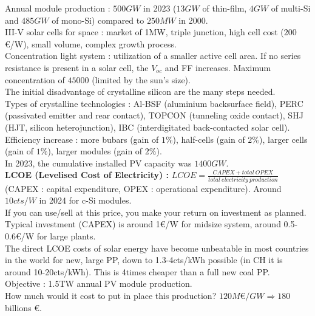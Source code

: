 \documentclass[../main.tex]{subfiles}
\begin{document}
Annual module production : $500GW$ in 2023 ($13GW$ of thin-film, $4GW$ of multi-Si and $485GW$ of mono-Si) compared to $250MW$ in 2000.\\

III-V solar cells for space : market of 1MW, triple junction, high cell cost ($200$€/W), small volume, complex growth process.\\

Concentration light system : utilization of a smaller active cell area. If no series resistance is present in a solar cell, the $V_{oc}$ and FF increases. Maximum concentration of $45000$ (limited by the sun's size). \\


The initial disadvantage of crystalline silicon are the many steps needed.\\
Types of crystalline technologies : Al-BSF (aluminium backsurface field), PERC (passivated emitter and rear contact), TOPCON (tunneling oxide contact), SHJ (HJT, silicon heterojunction), IBC (interdigitated back-contacted solar cell).\\

Efficiency increase : more bubars (gain of $1\%$), half-cells (gain of $2\%$), larger cells (gain of $1\%$), larger modules (gain of $2\%$).\\

In 2023, the cumulative installed PV capacity was $1400GW$.\\

\textbf{LCOE (Levelised Cost of Electricity) :} $LCOE = \frac{CAPEX + total\: OPEX}{total\: electricity\: production}$ (CAPEX : capital expenditure, OPEX : operational expenditure). Around $10cts/W$ in 2024 for c-Si modules.\\
If you can use/sell at this price, you make your return on investment as planned. \\

Typical investment (CAPEX) is around 1€/W for midsize system, around 0.5-0.6€/W for large plants. \\
The direct LCOE costs of solar energy have become unbeatable in most countries in the world for new, large PP, down to 1.3-4cts/kWh possible (in CH it is around 10-20cts/kWh). This is 4times cheaper than a full new coal PP.\\

Objective : 1.5TW annual PV module production.\\
How much would it cost to put in place this production? $120M$€$/GW \Rightarrow 180$billions €.\\
\end{document}
